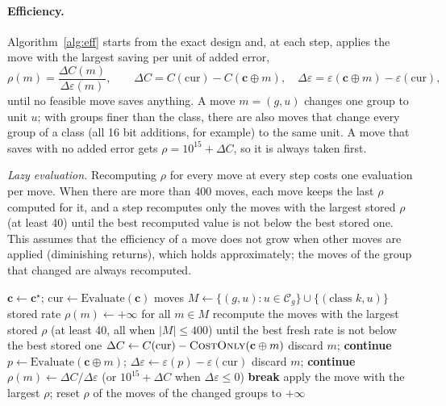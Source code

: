 \documentclass[11pt,a4paper]{article}
\newcommand{\Cost}{C}
\begin{document}
\paragraph{Efficiency.} Algorithm~\ref{alg:eff} starts from the exact design and, at each step, applies the move with
the largest saving per unit of added error,
\[
  \rho(m) = \frac{\Delta C(m)}{\Delta \varepsilon(m)}, \qquad
  \Delta C = \Cost(\text{cur}) - \Cost(\mathbf{c} \oplus m), \quad
  \Delta\varepsilon = \varepsilon(\mathbf{c} \oplus m) - \varepsilon(\text{cur}),
\]
until no feasible move saves anything. A move $m = (g, u)$ changes one group to unit $u$; with groups finer than the
class, there are also moves that change every group of a class (all 16 bit additions, for example) to the same unit.
A move that saves with no added error gets $\rho = 10^{15} + \Delta C$, so it is always taken first.

\emph{Lazy evaluation.} Recomputing $\rho$ for every move at every step costs one evaluation per move. When there are
more than 400 moves, each move keeps the last $\rho$ computed for it, and a step recomputes only the moves with the
largest stored $\rho$ (at least 40) until the best recomputed value is not below the best stored one. This assumes
that the efficiency of a move does not grow when other moves are applied (diminishing returns), which holds
approximately; the moves of the group that changed are always recomputed.

\begin{algorithm}[H]
\caption{Efficiency (greedy by saving per error, lazy evaluation)}\label{alg:eff}
\begin{algorithmic}[1]
\State $\mathbf{c} \gets \mathbf{c}^\star$; $\text{cur} \gets \text{Evaluate}(\mathbf{c})$
\State moves $M \gets \{(g, u) : u \in \mathcal{C}_g\} \cup \{(\text{class } k, u)\}$
\State stored rate $\rho(m) \gets +\infty$ for all $m \in M$
\Loop
  \State recompute the moves with the largest stored $\rho$ (at least 40, all when $|M| \le 400$) until the best
  fresh rate is not below the best stored one
    \State $\Delta C \gets \Cost(\text{cur}) - \textsc{CostOnly}(\mathbf{c} \oplus m)$
     discard $m$; \textbf{continue}
    \EndIf
    \State $p \gets \text{Evaluate}(\mathbf{c} \oplus m)$; \; $\Delta\varepsilon \gets \varepsilon(p) - \varepsilon(\text{cur})$
     discard $m$; \textbf{continue}
    \EndIf
    \State $\rho(m) \gets \Delta C / \Delta\varepsilon$ \; (or $10^{15} + \Delta C$ when $\Delta\varepsilon \le 0$)
  \EndFor
   \textbf{break}
  \EndIf
  \State apply the move with the largest $\rho$; reset $\rho$ of the moves of the changed groups to $+\infty$
\EndLoop
\end{algorithmic}
\end{algorithm}
\end{document}
